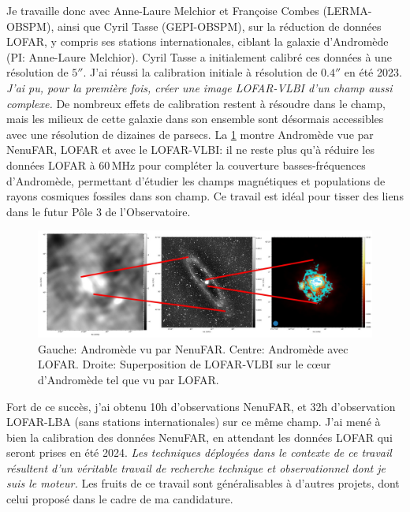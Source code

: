\pg
Je travaille donc avec Anne-Laure Melchior et Fran\c{c}oise Combes (LERMA-OBSPM), ainsi que Cyril Tasse (GEPI-OBSPM),  sur la r\'eduction de donn\'ees LOFAR, y compris ses stations internationales, ciblant la galaxie d'Androm\`ede (PI: Anne-Laure Melchior). Cyril Tasse a initialement calibr\'e ces donn\'ees \`a une r\'esolution de $5''$. J'ai r\'eussi la calibration initiale \`a r\'esolution de $0.4''$ en \'et\'e 2023. \textit{J'ai pu, pour la premi\`ere fois, cr\'eer une image LOFAR-VLBI d'un champ aussi complexe.} De nombreux effets de calibration restent \`a r\'esoudre dans le champ, mais les milieux de cette galaxie dans son ensemble sont d\'esormais accessibles avec une r\'esolution de dizaines de parsecs. La \cref{fig.andromeda} montre Androm\`ede vue par NenuFAR, LOFAR et avec le LOFAR-VLBI: il ne reste plus qu'\`a r\'eduire les donn\'ees LOFAR \`a 60\,MHz pour compl\'eter la couverture basses-fr\'equences d'Androm\`ede, permettant d'\'etudier les champs magn\'etiques et populations de rayons cosmiques fossiles dans son champ. Ce travail est id\'eal pour tisser des liens dans le futur P\^ole 3 de l'Observatoire.

\begin{figure}[H]
	\includegraphics[width=\linewidth]{andromeda-full.jpeg}
	\caption{Gauche: Androm\`ede vu par NenuFAR. Centre: Androm\`ede avec LOFAR. Droite: Superposition de LOFAR-VLBI sur le c{\oe}ur d'Androm\`ede tel que vu par LOFAR.} \label{fig.andromeda}
\end{figure}

\pg
Fort de ce succ\`es, j'ai obtenu 10h d'observations NenuFAR, et 32h d'observation LOFAR-LBA (sans stations internationales) sur ce m\^eme champ. J'ai men\'e \`a bien la calibration des donn\'ees NenuFAR, en attendant les donn\'ees LOFAR qui seront prises en \'et\'e 2024. \textit{Les techniques d\'eploy\'ees dans le contexte de ce travail r\'esultent d'un v\'eritable travail de recherche technique et observationnel dont je suis le moteur.} Les fruits de ce travail sont g\'en\'eralisables \`a d'autres projets, dont celui propos\'e dans le cadre de ma candidature.

